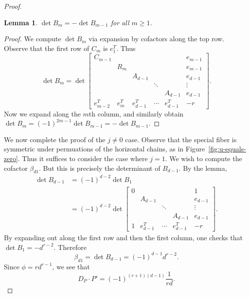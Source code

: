 \documentclass[reqno]{amsart}
\newtheorem{lemma}[thm]{Lemma}
\theoremstyle{definition}
\theoremstyle{remark}
\begin{document}
\begin{proof}
  \begin{lemma}
    $\det B_m = -\det B_{m-1}$ for all $m \geq 1$.
  \end{lemma}

  \begin{proof}
    We compute $\det B_m$ via expansion by cofactors along the top row. Observe that the first row of $C_m$ is $e_{1}^T$. Thus 
    \[
    \det B_m = \det \left[
      \begin{array}{cccccc}
        C_{m-1} & & & & & e_{m-1} \\
        & R_m & & & & e_{m-1} \\
        & & A_{d-1} & & & e_{d-1} \\
        & & & \ddots & & \vdots \\
        & & & & A_{d-1} & e_{d-1} \\
        e_{m-2}^T & e_{m}^T & e_{d-1}^T & \cdots & e_{d-1}^T & -r
      \end{array}\right].
    \]
    Now we expand along the $m$th column, and similarly obtain $\det B_m = (-1)^{2m-1}\det B_{m-1} = - \det B_{m-1}$.
  \end{proof}
  We now complete the proof of the $j \neq 0$ case. Observe that the special fiber is symmetric under permuations of the horizontal chains, as in Figure~\ref{fig:u-equals-zero}. Thus it suffices to consider the case where $j = 1$. We wish to compute the cofactor $\beta_{d1}$. But this is precisely the determinant of $B_{d-1}$. By the lemma, 
  \begin{align*}
    \det B_{d-1} &= (-1)^{d-2} \det B_1 \\
    &= (-1)^{d-2} \det \left[
      \begin{array}{cccccc}
        0 & & & & 1 \\
         & A_{d-1} & & & e_{d-1} \\
         & & \ddots & & \vdots \\
         & & & A_{d-1} & e_{d-1} \\
         1 & e_{d-1}^T & \cdots & e_{d-1}^T & -r
      \end{array}\right].
  \end{align*}
  By expanding out along the first row and then the first column, one checks that $\det B_1 = -d^{r-2}$. Therefore
  \[
  \beta_{d1} = \det B_{d-1} = (-1)^{d-1} d^{r-2}.
  \]
  Since $\phi = rd^{r-1}$, we see that 
  \[
  D_P \cdot P' = (-1)^{(r+1)(d-1)} \frac{1}{rd}.
  \]
\end{proof}

\end{document}
